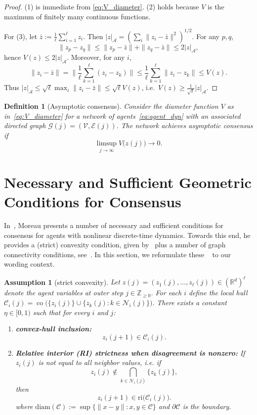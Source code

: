 \documentclass[12pt,draftcls,onecolumn]{IEEEtran}
\newtheorem{definition}{Definition}
\newtheorem{assumption}{Assumption}
\def\A{\mathcal{A}}
\def\Cij{\mathcal{C}_i (j)}
\def\ri{\mathrm{ri}}
\begin{document}
\begin{proof}
(1) is immediate from \eqref{eq:V_diameter}. (2) holds because $V$ is the maximum of finitely many continuous functions.

For (3), let $\bar z:=\frac{1}{\ell}\sum_{i=1}^\ell z_i$. Then $|z|_\A=(\sum_i\|z_i-\bar z\|^2)^{1/2}$.
For any $p,q$,
\[
\|z_p-z_q\|\le \|z_p-\bar z\|+\|z_q-\bar z\|\le 2|z|_\A,
\]
hence $V(z)\le 2|z|_\A$.
Moreover, for any $i$,
\[
\|z_i-\bar z\|=\Big\|\frac{1}{\ell}\sum_{k=1}^\ell (z_i-z_k)\Big\|
\le \frac{1}{\ell}\sum_{k=1}^\ell \|z_i-z_k\|\le V(z).
\]
Thus $|z|_\A \le \sqrt{\ell}\max_i\|z_i-\bar z\|\le \sqrt{\ell}V(z)$, i.e.\ $V(z)\ge \frac{1}{\sqrt{\ell}}|z|_\A$.
\end{proof}
\begin{definition}[Asymptotic consensus]\label{def:asymp_consensus}
Consider the diameter function $V$ as in~\eqref{eq:V_diameter} for a network of agents~\eqref{eq:agent_dyn} with an associated directed graph
$\mathcal{G}(j)=(\mathcal{V},\mathcal{E}(j))$.
The network achieves asymptotic consensus if 
\[
\limsup_{j\to\infty} V\big(z(j)\big) \to 0 .
\]
\end{definition}

\section{Necessary and Sufficient Geometric Conditions for Consensus}\label{sec:nec-suf-moreau}
In~\cite{Moreau.2005}, Moreau presents a number of necessary and sufficient conditions for consensus for agents with nonlinear discrete-time dynamics.
Towards this end, he provides a (strict) convexity condition, given by~\cite[Assumption~1]{Moreau.2005} plus a number of graph connectivity conditions, see~\cite[Theorems~2,~3]{Moreau.2005}.
In this section, we reformulate these ~\cite[Assumption~1]{Moreau.2005} to our wording context.
\begin{assumption}[strict convexity]
\label{ass:asymp_moreau_A1}
Let $z(j)=(z_1(j),\dots,z_\ell(j))\in(\mathbb R^d)^\ell$ denote the agent variables at outer step $j\in\mathbb Z_{\ge0}$.
For each $i$ define the local hull
$
\Cij=\operatorname{co}\big(\{z_i(j)\}\cup\{z_k(j):k\in\mathcal N_i(j)\}\big).
$
There exists a constant $\eta\in[0,1)$ such that for every $i$ and $j$:
\begin{enumerate}
\item \textbf{convex-hull inclusion:}
\begin{equation}
z_i(j+1)\in \Cij .
\label{eq:A1a_eps_hull}
\end{equation}
\item \textbf{Relative interior (RI) strictness when disagreement is nonzero:}
If $z_i(j)$ is not equal to all neighbor values, i.e. if
\[
z_i(j)\notin \bigcap_{k\in\mathcal N_i(j)}\{z_k(j)\},
\]
then
\begin{equation}
z_i(j+1)\in \ri\big(\Cij\big).
\label{eq:A1b_ri_strictness}
\end{equation}
where $\mathrm{diam}(\mathcal C):=\sup\{\|x-y\|:x,y\in\mathcal C\}$ and $\partial \mathcal C$ is the boundary.
\end{enumerate}
\end{assumption}
\end{document}
